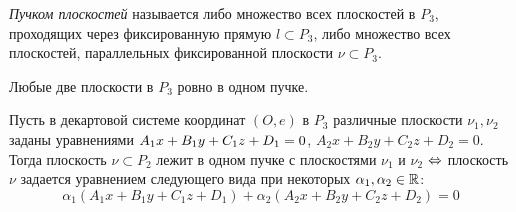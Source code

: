     \begin{definition}
    	\textit{Пучком плоскостей} называется либо множество всех плоскостей в $P_3$, проходящих через фиксированную прямую $l \subset P_3$, либо множество всех плоскостей, параллельных фиксированной плоскости $\nu \subset P_3$.
    \end{definition}
    
    \begin{note}
    	Любые две плоскости в $P_3$ ровно в одном пучке.
    \end{note}
    
    \begin{theorem}
    	Пусть в декартовой системе координат $(O, e)$ в $P_3$ различные плоскости $\nu_1, \nu_2$ заданы уравнениями $A_1x\hm{+}B_1y+C_1z+D_1=0$, $A_2x+B_2y+C_2z+D_2=0$. Тогда плоскость $\nu \subset P_2$ лежит в одном пучке с плоскостями $\nu_1$ и $\nu_2$ $\Leftrightarrow$ плоскость $\nu$ задается уравнением следующего вида при некоторых $\alpha_1, \alpha_2 \in \mathbb{R}$:
    	\[\alpha_1(A_1x+B_1y+C_1z+D_1) + \alpha_2(A_2x+B_2y+C_2z+D_2) = 0\]
    \end{theorem}
    
